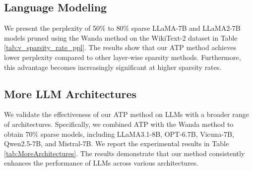 \subsection{Language Modeling}
We present the perplexity of 50$\%$ to 80$\%$ sparse LLaMA-7B and LLaMA2-7B models pruned using the Wanda method on the WikiText-2 dataset in Table \ref{tab:v_sparsity_rate_ppl}. The results show that our ATP method achieves lower perplexity compared to other layer-wise sparsity methods. Furthermore, this advantage becomes increasingly significant at higher sparsity rates. 
\begin{table}[h]
\centering
\renewcommand{\arraystretch}{1.1}
\caption{WikiText-2 perplexity of sparse LLaMA-7B/2-7B obtained by Wanda across varying sparsity rates.}
\label{tab:v_sparsity_rate_ppl}
\end{table}


\subsection{More LLM Architectures}
We validate the effectiveness of our ATP method on LLMs with a broader range of architectures. Specifically, we combined ATP with the Wanda method to obtain 70$\%$ sparse models, including LLaMA3.1-8B, OPT-6.7B, Vicuna-7B, Qwen2.5-7B, and Mistral-7B. We report the experimental results in Table \ref{tab:MoreArchitectures}. The results demonstrate that our method consistently enhances the performance of LLMs across various architectures.

